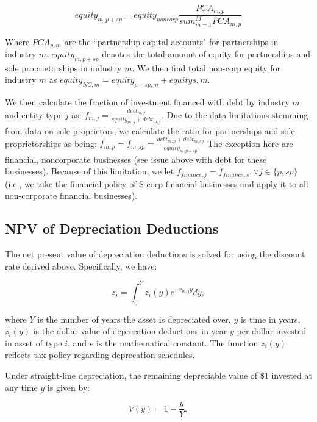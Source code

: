 \documentclass[article,11pt,letterpaper,fleqn]{article}
\theoremstyle{definition}
\numberwithin{equation}{section}
\begin{document}
\begin{equation}
equity_{m,p+sp} = equity_{noncorp}\frac{PCA_{m,p}}{sum_{m=1}^{M}PCA_{m,p}}
\end{equation}

Where $PCA_{p,m}$ are the ``partnership capital accounts" for partnerships in industry $m$.  $equity_{m,p+sp}$ denotes the total amount of equity for partnerships and sole proprietorships in industry $m$.  We then find total non-corp equity for industry $m$ as $equity_{NC,m} = equity_{p+sp,m} + equity{s,m}$.  

We then calculate the fraction of investment financed with debt by industry $m$ and entity type $j$ as: $f_{m,j} = \frac{debt_{m,j}}{equity_{m,j}+debt_{m,j}}$.  Due to the data limitations stemming from data on sole proprietors, we calculate the ratio for partnerships and sole proprietorships as being: $f_{m,p} = f_{m,sp} = \frac{debt_{m,p}+debt_{m,sp}}{equity_{m,p+sp}}$  The exception here are financial, noncorporate businesses (see issue above with debt for these businesses).  Because of this limitation, we let $f_{finance,j}=f_{finance,s}, \forall j\in\{p,sp\}$ (i.e., we take the financial policy of S-corp financial businesses and apply it to all non-corporate financial businesses).


\subsection{NPV of Depreciation Deductions}

The net present value of depreciation deductions is solved for using the discount rate derived above.  Specifically, we have: 

\begin{equation}
z_{i} = \int_{0}^{Y}z_{i}(y)e^{-r_{m,j}y}dy,
\end{equation}

\noindent\noindent where $Y$ is the number of years the asset is depreciated over, $y$ is time in years, $z_{i}(y)$ is the dollar value of deprecation deductions in year $y$ per dollar invested in asset of type $i$, and $e$ is the mathematical constant.  The function $z_{i}(y)$ reflects tax policy regarding deprecation schedules.  

Under straight-line depreciation, the remaining depreciable value of \$1 invested at any time $y$ is given by: 

\begin{equation}
V(y) =  1-\frac{y}{Y}, 
\end{equation}
\end{document}
